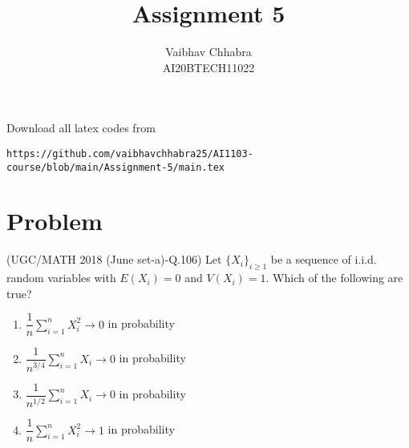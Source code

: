 \documentclass[journal,12pt,twocolumn]{IEEEtran}
\begin{document}
     \def\rightbox#1{\makebox[0in][r]{#1}}
     \def\centbox#1{\makebox[0in]{#1}}
     \def\topbox#1{\raisebox{-\baselineskip}[0in][0in]{#1}}
     \def\midbox#1{\raisebox{-0.5\baselineskip}[0in][0in]{#1}}
\vspace{3cm}
\title{Assignment 5}
\author{Vaibhav Chhabra \\ AI20BTECH11022}
\maketitle
\newpage
\bigskip
\renewcommand{\thefigure}{\theenumi}
\renewcommand{\thetable}{\theenumi}
Download all latex codes from 
\begin{lstlisting}
https://github.com/vaibhavchhabra25/AI1103-course/blob/main/Assignment-5/main.tex
\end{lstlisting}
\section{Problem}
(UGC/MATH 2018 (June set-a)-Q.106) Let $\{X_i\}_{i \geq 1}$ be a sequence of i.i.d. random variables with $E(X_i)=0$ and $V(X_i)=1$. Which of the following are true?
\vspace{0.2cm}
\begin{enumerate}
    \item $\dfrac{1}{n} \sum_{i=1}^n X_i^2 \to 0$ in probability \vspace{0.2cm}
    \item $\dfrac{1}{n^{3/4}} \sum_{i=1}^n X_i \to 0$ in probability \vspace{0.2cm}
    \item $\dfrac{1}{n^{1/2}} \sum_{i=1}^n X_i \to 0$ in probability \vspace{0.2cm}
    \item $\dfrac{1}{n} \sum_{i=1}^n X_i^2 \to 1$ in probability
\end{enumerate}
\end{document}
